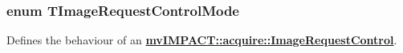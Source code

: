 \hypertarget{group___common_interface_ga9e620f0553e3519d83067243240c4518}{
\subsubsection[{T\+Image\+Request\+Control\+Mode}]{\setlength{\rightskip}{0pt plus 5cm}enum {\bf T\+Image\+Request\+Control\+Mode}}}\label{group___common_interface_ga9e620f0553e3519d83067243240c4518}


Defines the behaviour of an {\bfseries \hyperlink{classmv_i_m_p_a_c_t_1_1acquire_1_1_image_request_control}{mv\+I\+M\+P\+A\+C\+T\+::acquire\+::\+Image\+Request\+Control}}. 

